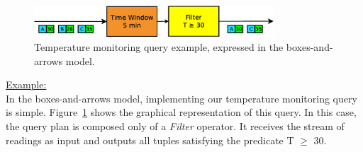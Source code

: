 \begin{figure}[b]
    \centering
    \includegraphics[width=0.8\textwidth]{img/tesi/baa-example}
    \caption{Temperature monitoring query example, expressed in the boxes-and-arrows model.}
    \label{fig:baa-example}
\end{figure}
\underline{Example:}\\
In the boxes-and-arrows model, implementing our temperature monitoring query is simple. 
Figure~\ref{fig:baa-example} shows the graphical representation of this query.
In this case, the query plan is composed only of a \emph{Filter} operator. It receives the stream of 
readings as input and outputs all tuples satisfying the predicate T $\geq$ 30. 


